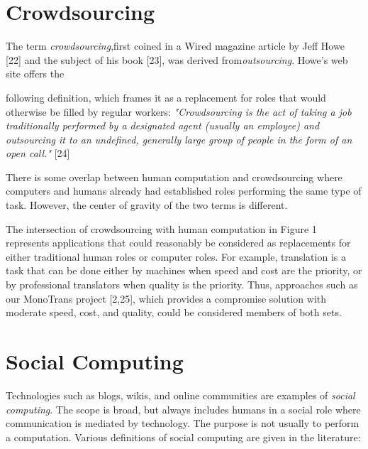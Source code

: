 \documentclass{acm_proc_article-sp}
\begin{document}
\section*{Crowdsourcing}
The term \textit{crowdsourcing},first coined in a Wired magazine article by Jeff Howe [22] and the subject of his book [23], was derived from\textit{outsourcing}. Howe's web site offers the
\begin{figure}
\end{figure}
 following definition, which frames it as a replacement for roles that would otherwise be filled by regular workers:
\textit{"Crowdsourcing is the act of taking a job traditionally performed by a designated agent (usually an employee) and outsourcing it to an undefined, generally large group of people in the form of an open call."} [24]

There is some overlap between human computation and crowdsourcing where computers and humans already had established roles performing the same type of task. However, the center of gravity of the two terms is different.

The intersection of crowdsourcing with human computation in Figure 1 represents applications that could reasonably be considered as replacements for either traditional human roles or computer roles. For example, translation is a task that can be done either by machines when speed and cost are the priority, or by professional translators when quality is the priority. Thus, approaches such as our MonoTrans project [2,25], which provides a compromise solution with moderate speed, cost, and quality, could be considered members of both sets.
\section*{Social Computing}
Technologies such as blogs, wikis, and online communities are examples of \textit{social computing}. The scope is broad, but always includes humans in a social role where communication is mediated by technology. The purpose is not usually to perform a computation. Various definitions of social computing are given in the literature:
\end{document}
